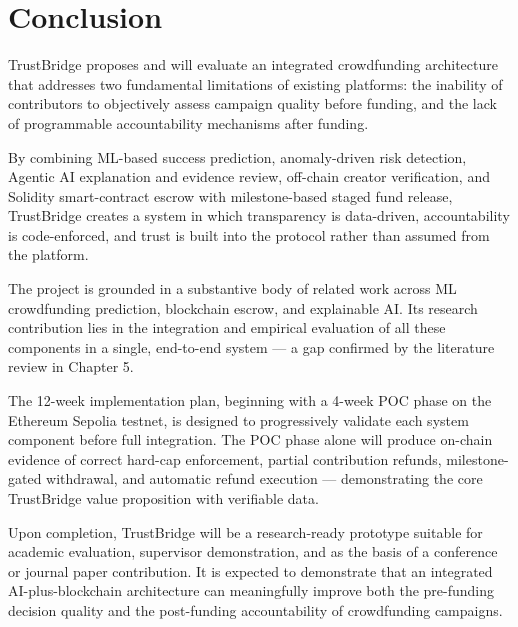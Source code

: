 \chapter{Conclusion}

TrustBridge proposes and will evaluate an integrated crowdfunding architecture that addresses two fundamental limitations of existing platforms: the inability of contributors to objectively assess campaign quality before funding, and the lack of programmable accountability mechanisms after funding.

By combining ML-based success prediction, anomaly-driven risk detection, Agentic AI explanation and evidence review, off-chain creator verification, and Solidity smart-contract escrow with milestone-based staged fund release, TrustBridge creates a system in which transparency is data-driven, accountability is code-enforced, and trust is built into the protocol rather than assumed from the platform.

The project is grounded in a substantive body of related work across ML crowdfunding prediction, blockchain escrow, and explainable AI. Its research contribution lies in the integration and empirical evaluation of all these components in a single, end-to-end system — a gap confirmed by the literature review in Chapter 5.

The 12-week implementation plan, beginning with a 4-week POC phase on the Ethereum Sepolia testnet, is designed to progressively validate each system component before full integration. The POC phase alone will produce on-chain evidence of correct hard-cap enforcement, partial contribution refunds, milestone-gated withdrawal, and automatic refund execution — demonstrating the core TrustBridge value proposition with verifiable data.

Upon completion, TrustBridge will be a research-ready prototype suitable for academic evaluation, supervisor demonstration, and as the basis of a conference or journal paper contribution. It is expected to demonstrate that an integrated AI-plus-blockchain architecture can meaningfully improve both the pre-funding decision quality and the post-funding accountability of crowdfunding campaigns.
